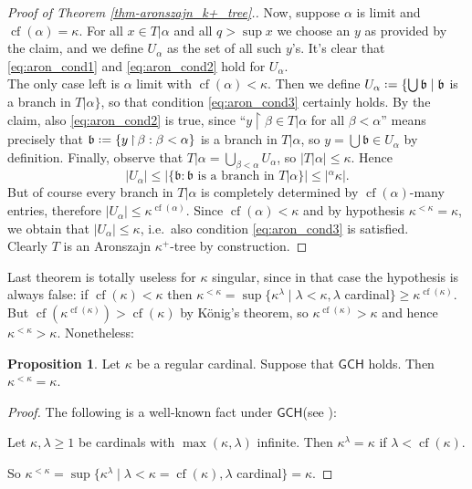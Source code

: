 \documentclass[12pt,a4paper]{report}
\theoremstyle{definition}
\newtheorem{proposition}[theorem]{Proposition}
\theoremstyle{num.custom-title}
\DeclareMathOperator{\restr}{\upharpoonright}
\DeclareMathOperator{\cf}{cf}
\newcommand{\GCH}{\ensuremath{\mathsf{GCH}}\xspace}
\newcommand*{\defeq}{\mathrel{\rlap{%
                     \raisebox{0.3ex}{$\cdot$}}%
                     \raisebox{-0.3ex}{$\cdot$}}%
                     =}
\begin{document}
\begin{proof}[Proof of Theorem \ref{thm-aronszajn_k+_tree}.]
Now, suppose $\alpha$ is limit and $\cf(\alpha) = \kappa$. For all $x \in T|\alpha$ and all $q > \sup x$ we choose an $y$ as provided by the claim, and we define $U_\alpha$ as the set of all such $y$'s. It's clear that \eqref{eq:aron_cond1} and \eqref{eq:aron_cond2} hold for $U_\alpha$.\\
The only case left is $\alpha$ limit with $\cf(\alpha) < \kappa$. Then we define $U_\alpha \defeq \{\bigcup \mathfrak{b} \mid \mathfrak{b}$ is a branch in $T|\alpha \}$, so that condition \eqref{eq:aron_cond3} certainly holds. By the claim, also \eqref{eq:aron_cond2} is true, since ``$y \restr \beta \in T|\alpha$ for all $\beta<\alpha$'' means precisely that $\mathfrak{b} \defeq \{y \restr \beta : \beta < \alpha\}$ is a branch in $T|\alpha$, so $y = \bigcup \mathfrak{b} \in U_\alpha$ by definition. Finally, observe that $T|\alpha = \bigcup_{\beta < \alpha} U_\alpha$, so $|T|\alpha| \leq \kappa$. Hence
\[
|U_\alpha| \leq |\{\mathfrak{b} : \mathfrak{b} \text{ is a branch in } T|\alpha\}| \leq |{}^\alpha \kappa|.
\]
But of course every branch in $T|\alpha$ is completely determined by $\cf(\alpha)$-many entries, therefore $|U_\alpha| \leq \kappa^{\cf(\alpha)}$. Since $\cf(\alpha)<\kappa$ and by hypothesis $\kappa^{<\kappa}=\kappa$, we obtain that $|U_\alpha| \leq \kappa$, i.e.\ also condition \eqref{eq:aron_cond3} is satisfied.\\[6pt]
Clearly $T$ is an Aronszajn $\kappa^+$-tree by construction.
\end{proof}

Last theorem is totally useless for $\kappa$ singular, since in that case the hypothesis is always false: if $\cf(\kappa)<\kappa$ then $\kappa^{<\kappa} = \sup\{\kappa^\lambda \mid \lambda < \kappa, \lambda$ cardinal$\} \geq \kappa^{\cf(\kappa)}$. But $\cf(\kappa^{\cf(\kappa)}) > \cf(\kappa)$ by König's theorem, so $\kappa^{\cf(\kappa)} > \kappa$ and hence $\kappa^{<\kappa} > \kappa$. Nonetheless:

\begin{proposition}
Let $\kappa$ be a regular cardinal. Suppose that \GCH holds. Then $\kappa^{<\kappa} = \kappa$.
\begin{proof}
The following is a well-known fact under \GCH (see \cite{Kun2009}):
\begin{center}
Let $\kappa,\lambda \geq 1$ be cardinals with $\max(\kappa,\lambda)$ infinite. Then $\kappa^\lambda = \kappa$ if $\lambda < \cf(\kappa)$.
\end{center}
So $\kappa^{<\kappa} = \sup\{\kappa^\lambda \mid \lambda < \kappa = \cf(\kappa), \lambda$ cardinal$\} = \kappa$.
\end{proof}
\end{proposition}
\end{document}
